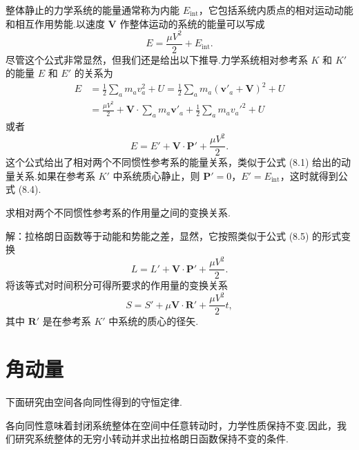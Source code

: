 整体静止的力学系统的能量通常称为内能 $E_\mathrm{int}$，它包括系统内质点的相对运动动能和相互作用势能.以速度 $\boldsymbol{V}$ 作整体运动的系统的能量可以写成
\begin{equation}
  E=\frac{\mu V^2}{2}+E_\mathrm{int}.
\end{equation}
尽管这个公式非常显然，但我们还是给出以下推导.力学系统相对参考系 $K$ 和 $K'$ 的能量 $E$ 和 $E'$ 的关系为
\begin{equation*}
\begin{aligned}
  E&=\frac{1}{2}\sum_a m_a v_a^2+U
  =\frac{1}{2}\sum_a m_a\left(\boldsymbol{v}'_a+\boldsymbol{V}\right)^2+U\\
  &=\frac{\mu V^2}{2}+\boldsymbol{V}\cdot\sum_a m_a\boldsymbol{v}'_a
  +\frac{1}{2}\sum_a m_a v_a'^2+U
\end{aligned}
\end{equation*}
或者
\begin{equation}
  E=E'+\boldsymbol{V}\cdot\boldsymbol{P}'+\frac{\mu V^2}{2}.
\end{equation}
这个公式给出了相对两个不同惯性参考系的能量关系，类似于公式 (8.1) 给出的动量关系.如果在参考系 $K'$ 中系统质心静止，则 $\boldsymbol{P}'=0$，$E'=E_\mathrm{int}$，这时就得到公式 (8.4).

\begin{xiti}

\quad 求相对两个不同惯性参考系的作用量之间的变换关系.

解：拉格朗日函数等于动能和势能之差，显然，它按照类似于公式 (8.5) 的形式变换
\begin{equation*}
  L=L'+\boldsymbol{V}\cdot\boldsymbol{P}'+\frac{\mu V^2}{2}.
\end{equation*}
将该等式对时间积分可得所要求的作用量的变换关系
\begin{equation*}
  S=S'+\mu\boldsymbol{V}\cdot\boldsymbol{R}'
  +\frac{\mu V^2}{2}t,
\end{equation*}
其中 $\boldsymbol{R}'$ 是在参考系 $K'$ 中系统的质心的径矢.

\end{xiti}

\section{角动量}

下面研究由空间各向同性得到的守恒定律.

各向同性意味着封闭系统整体在空间中任意转动时，力学性质保持不变.因此，我们研究系统整体的无穷小转动并求出拉格朗日函数保持不变的条件.


